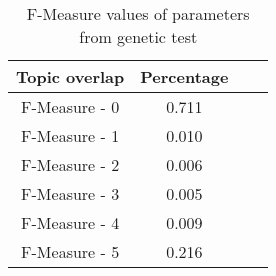 \begin{table}
\begin{center}
\begin{tabular}{|c|c|c|c|}
\hline
Topic overlap & Percentage\\ 
\hline
F-Measure - 0&    0.711\\ 
F-Measure - 1&    0.010\\ 
F-Measure - 2&    0.006\\ 
F-Measure - 3&    0.005\\ 
F-Measure - 4&    0.009\\ 
F-Measure - 5&    0.216\\ 
\hline
\end{tabular}
\end{center}
\caption{F-Measure values of parameters from genetic test}
\label{tab:geneticparametersfmeasure}
\end{table}








